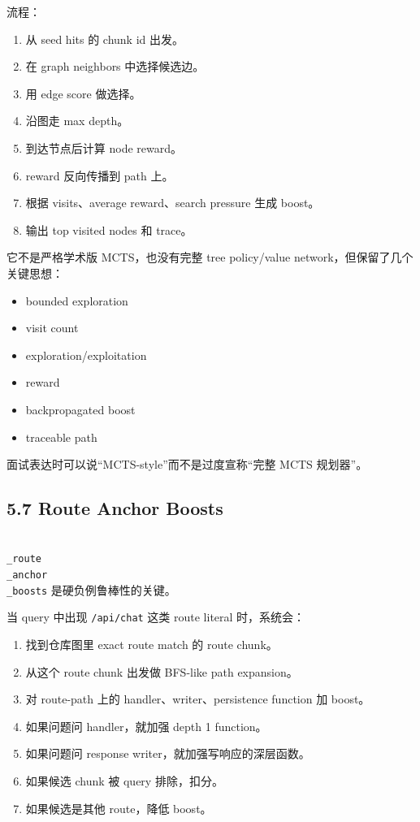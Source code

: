 \documentclass[UTF8,12pt,openany]{ctexbook}
\begin{document}
流程：\par

\begin{enumerate}
\item 从 seed hits 的 chunk id 出发。
\item 在 graph neighbors 中选择候选边。
\item 用 edge score 做选择。
\item 沿图走 max depth。
\item 到达节点后计算 node reward。
\item reward 反向传播到 path 上。
\item 根据 visits、average reward、search pressure 生成 boost。
\item 输出 top visited nodes 和 trace。
\end{enumerate}

它不是严格学术版 MCTS，也没有完整 tree policy/value network，但保留了几个关键思想：\par

\begin{itemize}
\item bounded exploration
\item visit count
\item exploration/exploitation
\item reward
\item backpropagated boost
\item traceable path
\end{itemize}

面试表达时可以说“MCTS-style”而不是过度宣称“完整 MCTS 规划器”。\par

\subsection{5.7 Route Anchor Boosts}

\texttt{\\_route\\_anchor\\_boosts} 是硬负例鲁棒性的关键。\par

当 query 中出现 \texttt{/api/chat} 这类 route literal 时，系统会：\par

\begin{enumerate}
\item 找到仓库图里 exact route match 的 route chunk。
\item 从这个 route chunk 出发做 BFS-like path expansion。
\item 对 route-path 上的 handler、writer、persistence function 加 boost。
\item 如果问题问 handler，就加强 depth 1 function。
\item 如果问题问 response writer，就加强写响应的深层函数。
\item 如果候选 chunk 被 query 排除，扣分。
\item 如果候选是其他 route，降低 boost。
\end{enumerate}
\end{document}
